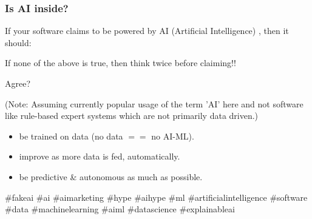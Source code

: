 \begin{frame}[fragile]\frametitle{Is AI inside?}
If your software claims to be powered by AI (Artificial Intelligence) ,
then it should:

If none of the above is true, then think twice before claiming!!

Agree?


(Note: Assuming currently popular usage of the term 'AI' here and not software like rule-based expert systems which are not primarily data driven.)

				\begin{itemize}
				\item be trained on data (no data $==$ no AI-ML).
				\item improve as more data is fed, automatically.
				\item be predictive \& autonomous as much as possible.
				\end{itemize}

\#fakeai \#ai \#aimarketing \#hype \#aihype \#ml \#artificialintelligence \#software \#data \#machinelearning \#aiml \#datascience \#explainableai

\end{frame}

